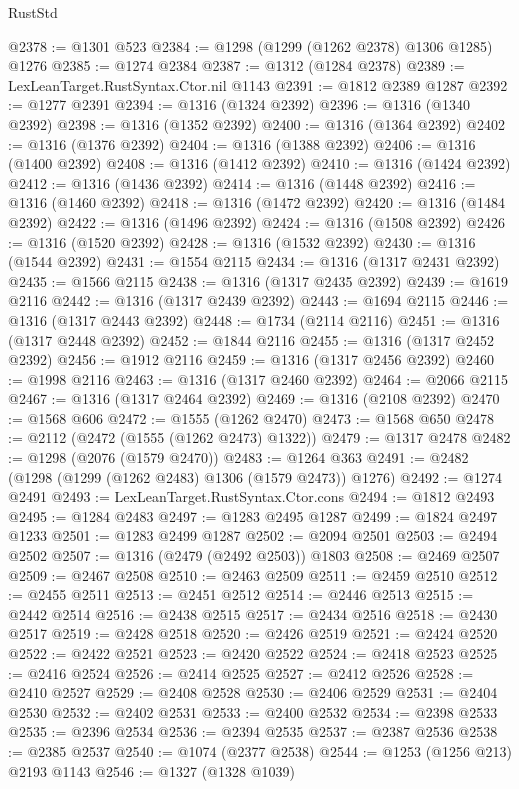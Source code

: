 \begin{lexlean}{RustStd}
\begin{coremodule}
@2378 := @1301 @523
@2384 := @1298 (@1299 (@1262 @2378) @1306 @1285) @1276
@2385 := @1274 @2384
@2387 := @1312 (@1284 @2378)
@2389 := LexLeanTarget.RustSyntax.Ctor.nil @1143
@2391 := @1812 @2389 @1287
@2392 := @1277 @2391
@2394 := @1316 (@1324 @2392)
@2396 := @1316 (@1340 @2392)
@2398 := @1316 (@1352 @2392)
@2400 := @1316 (@1364 @2392)
@2402 := @1316 (@1376 @2392)
@2404 := @1316 (@1388 @2392)
@2406 := @1316 (@1400 @2392)
@2408 := @1316 (@1412 @2392)
@2410 := @1316 (@1424 @2392)
@2412 := @1316 (@1436 @2392)
@2414 := @1316 (@1448 @2392)
@2416 := @1316 (@1460 @2392)
@2418 := @1316 (@1472 @2392)
@2420 := @1316 (@1484 @2392)
@2422 := @1316 (@1496 @2392)
@2424 := @1316 (@1508 @2392)
@2426 := @1316 (@1520 @2392)
@2428 := @1316 (@1532 @2392)
@2430 := @1316 (@1544 @2392)
@2431 := @1554 @2115
@2434 := @1316 (@1317 @2431 @2392)
@2435 := @1566 @2115
@2438 := @1316 (@1317 @2435 @2392)
@2439 := @1619 @2116
@2442 := @1316 (@1317 @2439 @2392)
@2443 := @1694 @2115
@2446 := @1316 (@1317 @2443 @2392)
@2448 := @1734 (@2114 @2116)
@2451 := @1316 (@1317 @2448 @2392)
@2452 := @1844 @2116
@2455 := @1316 (@1317 @2452 @2392)
@2456 := @1912 @2116
@2459 := @1316 (@1317 @2456 @2392)
@2460 := @1998 @2116
@2463 := @1316 (@1317 @2460 @2392)
@2464 := @2066 @2115
@2467 := @1316 (@1317 @2464 @2392)
@2469 := @1316 (@2108 @2392)
@2470 := @1568 @606
@2472 := @1555 (@1262 @2470)
@2473 := @1568 @650
@2478 := @2112 (@2472 (@1555 (@1262 @2473) @1322))
@2479 := @1317 @2478
@2482 := @1298 (@2076 (@1579 @2470))
@2483 := @1264 @363
@2491 := @2482 (@1298 (@1299 (@1262 @2483) @1306 (@1579 @2473)) @1276)
@2492 := @1274 @2491
@2493 := LexLeanTarget.RustSyntax.Ctor.cons
@2494 := @1812 @2493
@2495 := @1284 @2483
@2497 := @1283 @2495 @1287
@2499 := @1824 @2497 @1233
@2501 := @1283 @2499 @1287
@2502 := @2094 @2501
@2503 := @2494 @2502
@2507 := @1316 (@2479 (@2492 @2503)) @1803
@2508 := @2469 @2507
@2509 := @2467 @2508
@2510 := @2463 @2509
@2511 := @2459 @2510
@2512 := @2455 @2511
@2513 := @2451 @2512
@2514 := @2446 @2513
@2515 := @2442 @2514
@2516 := @2438 @2515
@2517 := @2434 @2516
@2518 := @2430 @2517
@2519 := @2428 @2518
@2520 := @2426 @2519
@2521 := @2424 @2520
@2522 := @2422 @2521
@2523 := @2420 @2522
@2524 := @2418 @2523
@2525 := @2416 @2524
@2526 := @2414 @2525
@2527 := @2412 @2526
@2528 := @2410 @2527
@2529 := @2408 @2528
@2530 := @2406 @2529
@2531 := @2404 @2530
@2532 := @2402 @2531
@2533 := @2400 @2532
@2534 := @2398 @2533
@2535 := @2396 @2534
@2536 := @2394 @2535
@2537 := @2387 @2536
@2538 := @2385 @2537
@2540 := @1074 (@2377 @2538)
@2544 := @1253 (@1256 @213) @2193 @1143
@2546 := @1327 (@1328 @1039)

\end{coremodule}
\end{lexlean}
